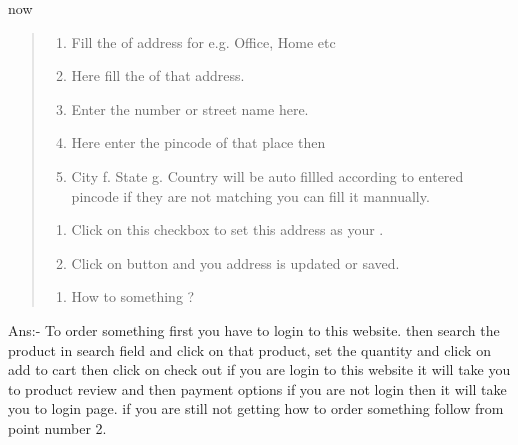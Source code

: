 \documentclass[a4paper,10pt,english]{report}
\begin{document}
\begin{figure}[htbp]
\centering

\noindent{}
\end{figure}

now
\begin{quote}
\begin{enumerate}
\def\theenumi{\alph{enumi}}
\def\labelenumi{\theenumi .}
\makeatletter\def\p@enumii{\p@enumi \theenumi .}\makeatother
\item {} 
Fill the  of address for e.g. Office, Home etc

\item {} 
Here fill the  of that address.

\item {} 
Enter the  number or street name here.

\item {} 
Here enter the pincode of that place then

\item {} 
City f. State g. Country will be auto fillled according to entered pincode if they are not matching you can fill it mannually.

\end{enumerate}
\begin{enumerate}
\def\theenumi{\alph{enumi}}
\def\labelenumi{\theenumi .}
\makeatletter\def\p@enumii{\p@enumi \theenumi .}\makeatother
\setcounter{enumi}{7}
\item {} 
Click on this checkbox to set this address as your  .

\item {} 
Click on  button and you address is updated or saved.

\end{enumerate}
\begin{enumerate}
\def\theenumi{\arabic{enumi}}
\def\labelenumi{\theenumi .}
\makeatletter\def\p@enumii{\p@enumi \theenumi .}\makeatother
\setcounter{enumi}{3}
\item {} 
How to  something ?

\end{enumerate}
\end{quote}

Ans:- To order something first you have to login to this website. then search the product in search field and click on that product, set the quantity and click on add to cart then click on check out if you are login to this website it will take you to product review and then payment options if you are not login then it will take you to login page. if you are still not getting how to order something follow {\hyperref[\detokenize{index:welcome-to-monomerce}]{}} from point number 2.
\end{document}
